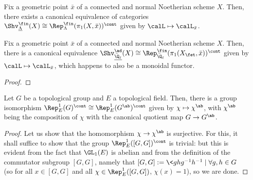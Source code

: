         \begin{convention} \label{conv: base_schemes_for_adic_sheaves}
            
        \end{convention}
        \begin{definition} \label{def: m_adic_sheaves}
            
        \end{definition}
        
        \begin{definition} \label{def: l_adic_sheaves}
            
        \end{definition}
        
        \begin{lemma}
            \cite[\href{https://stacks.math.columbia.edu/tag/0GIY}{Tag 0GIY}]{stacks} Fix a geometric point $\bar{x}$ of a connected and normal Noetherian scheme $X$. Then, there exists a canonical equivalence of categories $\Shv_{\underline{\Lambda}}^{\fin}(X) \cong \Rep_{\Lambda}^{\fin}(\pi_1(X, \bar{x}))^{\cont}$ given by $\calL \mapsto \calL_{\bar{x}}$.
        \end{lemma}
        \begin{theorem} \label{theorem: galois_representations_are_local_systems}
            Fix a geometric point $\bar{x}$ of a connected and normal Noetherian scheme $X$. Then, there is a canonical equivalence $\Shv_{\underline{\bar{\Q}_{\ell}}}^{\ad}(X) \cong \Rep_{\bar{\Q}_{\ell}}^{\fin}(\pi_1(X_{\fet}, \bar{x}))^{\cont}$ given by $\calL \mapsto \calL_{\bar{x}}$, which happens to also be a monoidal functor.
        \end{theorem}
            \begin{proof}
                
            \end{proof}
        \begin{lemma} \label{lemma: abelianising_continuous_characters}
            Let $G$ be a topological group and $E$ a topological field. Then, there is a group isomorphism $\Rep^1_E(G)^{\cont} \cong \Rep^1_E(G^{\ab})^{\cont}$ given by $\chi \mapsto \chi^{\ab}$, with $\chi^{\ab}$ being the composition of $\chi$ with the canonical quotient map $G \to G^{\ab}$.
        \end{lemma}
            \begin{proof}
                Let us show that the homomorphism $\chi \to \chi^{\ab}$ is surjective. For this, it shall suffice to show that the group $\Rep^1_E([G, G])^{\cont}$ is trivial: but this is evident from the fact that $\GL_1(E)$ is abelian and from the definition of the commutator subgroup $[G, G]$, namely that $[G, G] := \<ghg^{-1}h^{-1} \mid \forall g, h \in G\>$ (so for all $x \in [G, G]$ and all $\chi \in \Rep^1_E([G, G])$, $\chi(x) = 1$), so we are done.
            \end{proof}
